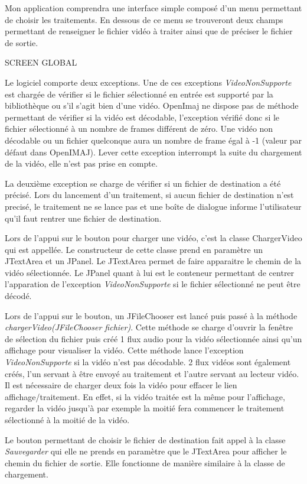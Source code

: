 \documentclass[10pt,a4paper]{article}
\begin{document}
Mon application comprendra une interface simple composé d'un menu permettant de choisir les traitements. En dessous de ce menu se trouveront deux champs permettant de renseigner le fichier vidéo à traiter ainsi que de préciser le fichier de sortie.

SCREEN GLOBAL

Le logiciel comporte deux exceptions. Une de ces exceptions \textit{VideoNonSupporte} est chargée de vérifier si le fichier sélectionné en entrée est supporté par la bibliothèque ou s'il s'agit bien d'une vidéo. OpenImaj ne dispose pas de méthode permettant de vérifier si la vidéo est décodable, l'exception vérifié donc si le fichier sélectionné à un nombre de frames différent de zéro. Une vidéo non décodable ou un fichier quelconque aura un nombre de frame égal à -1 (valeur par défaut dans OpenIMAJ). Lever cette exception interrompt la suite du chargement de la vidéo, elle n'est pas prise en compte.

La deuxième exception se charge de vérifier si un fichier de destination a été précisé. Lors du lancement d'un traitement, si aucun fichier de destination n'est precisé, le traitement ne se lance pas et une boîte de dialogue informe l'utilisateur qu'il faut rentrer une fichier de destination.


Lors de l'appui sur le bouton pour charger une vidéo, c'est la classe ChargerVideo qui est appellée.
Le constructeur de cette classe prend en paramètre un JTextArea et un JPanel. Le JTextArea permet de faire apparaitre le chemin de la vidéo sélectionnée. Le JPanel quant à lui est le conteneur permettant de centrer l'apparation de l'exception \textit{VideoNonSupporte} si le fichier sélectionné ne peut être décodé.

Lors de l'appui sur le bouton, un JFileChooser est lancé puis passé à la méthode \textit{chargerVideo(JFileChooser fichier)}.
Cette méthode se charge d'ouvrir la fenêtre de sélection du fichier puis créé 1 flux audio pour la vidéo sélectionnée ainsi qu'un affichage pour visualiser la vidéo. Cette méthode lance l'exception \textit{VideoNonSupporte} si la vidéo n'est pas décodable.
2 flux vidéos sont également créés, l'un servant à être envoyé au traitement et l'autre servant au lecteur vidéo. Il est
nécessaire de charger deux fois la vidéo pour effacer le lien affichage/traitement. En effet, si la vidéo traitée est la même pour l'affichage, regarder la vidéo jusqu'à par exemple la moitié fera commencer le traitement sélectionné à la moitié de la vidéo.

Le bouton permettant de choisir le fichier de destination fait appel à la classe \textit{Sauvegarder} qui elle ne prends en paramètre que le JTextArea pour afficher le chemin du fichier de sortie. Elle fonctionne de manière similaire à la classe de chargement.
\end{document}

